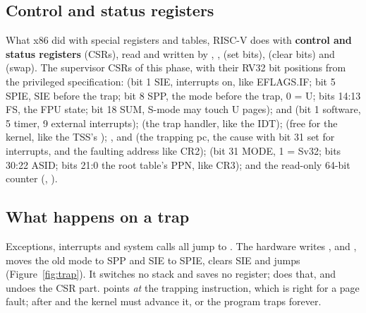 \documentclass[11pt,a4paper]{article}
\begin{document}
\subsection{Control and status registers}

What x86 did with special registers and tables, RISC-V does with \textbf{control and status registers} (CSRs), read
and written by , ,  (set bits),  (clear bits) and  (swap). The
supervisor CSRs of this phase, with their RV32 bit positions from the privileged specification:
 (bit 1 SIE, interrupts on, like EFLAGS.IF; bit 5 SPIE, SIE before the trap; bit 8 SPP, the mode before
the trap, 0 = U; bits 14:13 FS, the FPU state; bit 18 SUM, S-mode may touch U pages);  and  (bit 1
software, 5 timer, 9 external interrupts);  (the trap handler, like the IDT);  (free for the
kernel, like the TSS's ); ,  and  (the trapping pc, the cause with bit
31 set for interrupts, and the faulting address like CR2);  (bit 31 MODE, 1 = Sv32; bits 30:22 ASID; bits
21:0 the root table's PPN, like CR3); and the read-only 64-bit  counter (, ).

\subsection{What happens on a trap}

Exceptions, interrupts and system calls all jump to . The hardware writes ,  and
, moves the old mode to SPP and SIE to SPIE, clears SIE and jumps (Figure~\ref{fig:trap}). It switches no
stack and saves no register;  does that, and  undoes the CSR part.  points
\emph{at} the trapping instruction, which is right for a page fault; after  and  the kernel
must advance it, or the program traps forever.
\end{document}
